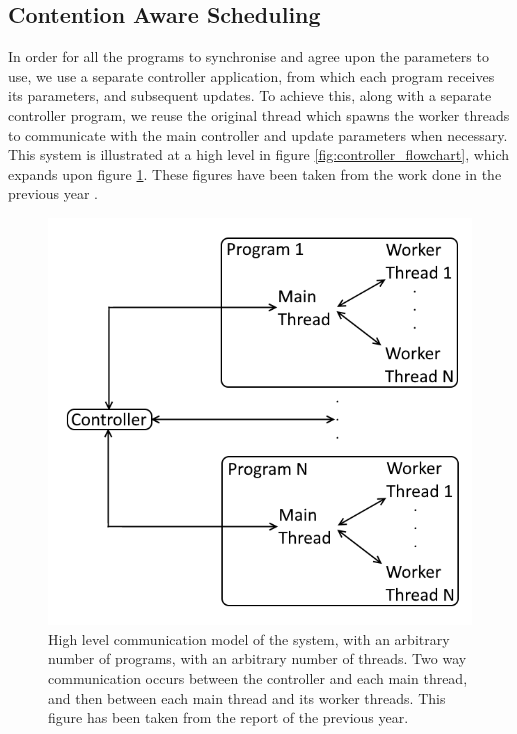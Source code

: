 \subsection{Contention Aware Scheduling}
\label{section:implementation:contention_aware_scheduling}

In order for all the programs to synchronise and agree upon the parameters to use, we use a separate controller application, from which each program receives its parameters, and subsequent updates. To achieve this, along with a separate controller program, we reuse the original thread which spawns the worker threads to communicate with the main controller and update parameters when necessary. This system is illustrated at a high level in figure \ref{fig:controller_flowchart}, which expands upon figure \ref{fig:communication_structure}. These figures have been taken from the work done in the previous year \cite{me}.



\begin{figure}[H]
	\centering
	\includegraphics[width=\textwidth]{graphics/communication_structure.png}
	\caption{High level communication model of the system, with an arbitrary number of programs, with an arbitrary number of threads. Two way communication occurs between the controller and each main thread, and then between each main thread and its worker threads. This figure has been taken from the report of the previous year.}
	\label{fig:communication_structure}
\end{figure}



